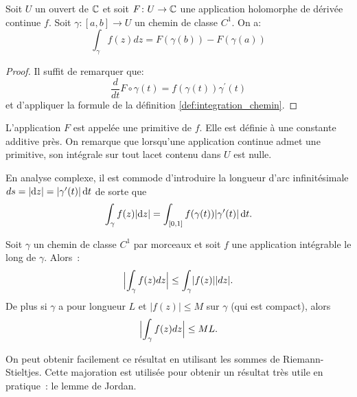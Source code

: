 \begin{fprop}
Soit $U$ un ouvert de $\mathbb{C}$ et soit $F \colon U \to \mathbb{C}$ une application holomorphe de dérivée continue $f$. Soit $\gamma \colon [a,b] \to U$ un chemin de classe $C^1$. On a:
\[
\int_\gamma f(z) dz = F(\gamma(b)) - F(\gamma(a))
\]
\end{fprop}
\begin{proof}
Il suffit de remarquer que:
\[
\frac{d}{dt}F\circ \gamma(t) = f(\gamma(t)) \gamma^\prime(t)
\]
et d'appliquer la formule de la définition \ref{def:integration_chemin}.
\end{proof}
\begin{rem}
L'application $F$ est appelée une primitive de $f$. Elle est définie à une constante additive près. On remarque que lorsqu'une application continue admet une primitive, son intégrale sur tout lacet contenu dans $U$ est nulle. 
\end{rem}
En analyse complexe, il est commode d'introduire la longueur d'arc infinitésimale $ds = \lvert \mathop{}\mathopen{}\mathrm{d} z \rvert =\lvert\gamma^\prime(t)\rvert\mathop{}\mathopen{}\mathrm{d} t$ de sorte que
\[\int_ \gamma f(z) \lvert \mathop{}\mathopen{}\mathrm{d} z \rvert = \int_{[0,1]} f(\gamma(t)) \lvert\gamma^\prime(t)\rvert \mathop{}\mathopen{}\mathrm{d} t .\]
\begin{fprop}
Soit $\gamma$ un chemin de classe $C^1$ par morceaux et soit $f$ une application  intégrable le long de $\gamma$. Alors~:
\[
\Bigl \lvert\int_{\gamma} f(z) dz\Bigr \rvert \leq \int_{\gamma} \lvert f(z) \rvert \lvert dz \rvert.
\]
De plus si $\gamma$ a pour longueur $L$ et $\lvert f(z) \rvert \leq M$ sur $\gamma$ (qui est compact), alors
\[
\Bigl \lvert\int_{\gamma} f(z) dz\Bigr \rvert \leq M L.
\]
\end{fprop}
On peut obtenir facilement ce résultat en utilisant les sommes de Riemann-Stieltjes.
Cette majoration est utilisée pour obtenir un résultat très utile en
pratique~: le lemme de Jordan.

